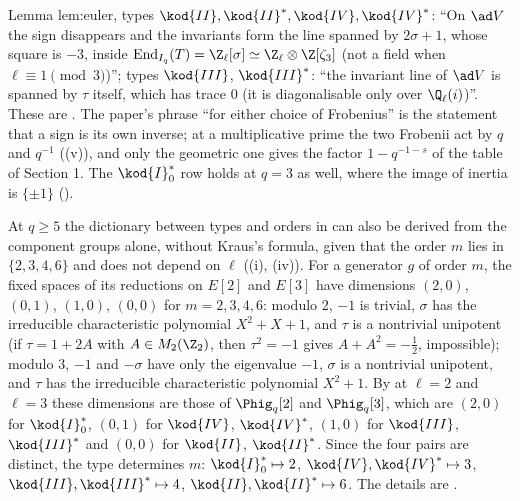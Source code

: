 \begin{paperlink}
Lemma lem:euler, types $\kod{II},\kod{II}^*,\kod{IV},\kod{IV}^*$: ``On $\ad V$ the sign disappears and the invariants form the line spanned by
$2\sigma+1$, whose square is $-3$, inside $\operatorname{End}_{I_q}(T)=\Z_\ell[\sigma]\simeq\Z_\ell\otimes\Z[\zeta_3]$ (not a field when
$\ell\equiv1\pmod3$)''; types $\kod{III}$, $\kod{III}^*$: ``the invariant line of $\ad V$ is spanned by $\tau$ itself, which has trace $0$ (it is
diagonalisable only over $\Q_\ell(i)$)''. These are . The paper's phrase ``for either choice of Frobenius'' is the
statement that a sign is its own inverse; at a multiplicative prime the two Frobenii act by $q$ and $q^{-1}$ ((v)), and
only the geometric one gives the factor $1-q^{-1-s}$ of the table of Section 1. The $\kod{I}_0^*$ row holds at $q=3$ as well, where the image of
inertia is $\{\pm1\}$ ().
\end{paperlink}

\begin{remark}\label{rem:galrep:kraus-from-components}
At $q\ge5$ the dictionary between types and orders in  can also be derived from the component groups alone,
without Kraus's formula, given that the order $m$ lies in $\{2,3,4,6\}$ and does not depend on $\ell$ ((i), (iv)). For
a generator $g$ of order $m$, the fixed spaces of its reductions on $E[2]$ and $E[3]$ have dimensions $(2,0)$, $(0,1)$, $(1,0)$, $(0,0)$ for
$m=2,3,4,6$: modulo $2$, $-1$ is trivial, $\sigma$ has the irreducible characteristic polynomial $X^2+X+1$, and $\tau$ is a nontrivial unipotent (if
$\tau=1+2A$ with $A\in M_2(\Z_2)$, then $\tau^2=-1$ gives $A+A^2=-\frac12$, impossible); modulo $3$, $-1$ and $-\sigma$ have only the eigenvalue $-1$,
$\sigma$ is a nontrivial unipotent, and $\tau$ has the irreducible characteristic polynomial $X^2+1$. By  at
$\ell=2$ and $\ell=3$ these dimensions are those of $\Phig_q[2]$ and $\Phig_q[3]$, which are $(2,0)$ for $\kod{I}_0^*$, $(0,1)$ for $\kod{IV}$, $\kod{IV}^*$,
$(1,0)$ for $\kod{III}$, $\kod{III}^*$ and $(0,0)$ for $\kod{II}$, $\kod{II}^*$. Since the four pairs are distinct, the type determines $m$:
$\kod{I}_0^*\mapsto2$, $\kod{IV},\kod{IV}^*\mapsto3$, $\kod{III},\kod{III}^*\mapsto4$, $\kod{II},\kod{II}^*\mapsto6$. The details are .
\end{remark}

